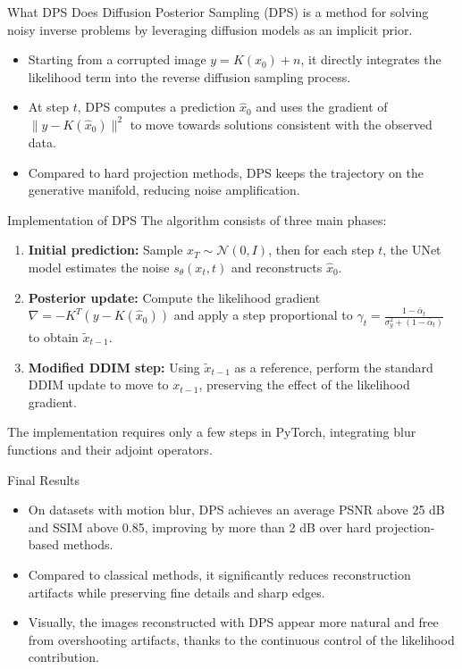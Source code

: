 \begin{frame}{What DPS Does}
  Diffusion Posterior Sampling (DPS) is a method for solving noisy inverse problems by leveraging diffusion models as an implicit prior.
  \begin{itemize}
    \item Starting from a corrupted image $y = K(x_0) + n$, it directly integrates the likelihood term into the reverse diffusion sampling process.
    \item At step $t$, DPS computes a prediction $\hat x_0$ and uses the gradient of $\|y - K(\hat x_0)\|^2$ to move towards solutions consistent with the observed data.
    \item Compared to hard projection methods, DPS keeps the trajectory on the generative manifold, reducing noise amplification.
  \end{itemize}
\end{frame}

\begin{frame}[fragile]{Implementation of DPS}
  The algorithm consists of three main phases:
  \begin{enumerate}
    \item \textbf{Initial prediction:} Sample $x_T \sim \mathcal{N}(0, I)$, then for each step $t$, the UNet model estimates the noise $s_\theta(x_t, t)$ and reconstructs $\hat x_0$.
    \item \textbf{Posterior update:} Compute the likelihood gradient $\nabla = -K^T(y - K(\hat x_0))$ and apply a step proportional to $\gamma_t = \frac{1 - \bar\alpha_t}{\sigma_y^2 + (1 - \bar\alpha_t)}$ to obtain $\tilde x_{t-1}$.
    \item \textbf{Modified DDIM step:} Using $\tilde x_{t-1}$ as a reference, perform the standard DDIM update to move to $x_{t-1}$, preserving the effect of the likelihood gradient.
  \end{enumerate}
  \vspace{0.5em}
  The implementation requires only a few steps in PyTorch, integrating blur functions and their adjoint operators.
\end{frame}

\begin{frame}{Final Results}
  \begin{itemize}
    \item On datasets with motion blur, DPS achieves an average PSNR above 25 dB and SSIM above 0.85, improving by more than 2 dB over hard projection-based methods.
    \item Compared to classical methods, it significantly reduces reconstruction artifacts while preserving fine details and sharp edges.
    \item Visually, the images reconstructed with DPS appear more natural and free from overshooting artifacts, thanks to the continuous control of the likelihood contribution.
  \end{itemize}
\end{frame}